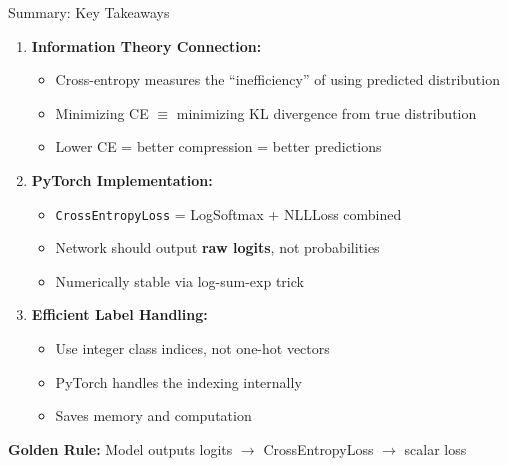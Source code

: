 \documentclass[xcolor=svgnames, 8pt, handout, standalone]{beamer}
\newcommand{\1}{\mathbf{1}}
\begin{document}
\begin{frame}{Summary: Key Takeaways}
\begin{enumerate}
\item \textbf{Information Theory Connection:}
\begin{itemize}
\item Cross-entropy measures the ``inefficiency'' of using predicted distribution
\item Minimizing CE $\equiv$ minimizing KL divergence from true distribution
\item Lower CE = better compression = better predictions
\end{itemize}

\vspace{0.5em}
\item \textbf{PyTorch Implementation:}
\begin{itemize}
\item \texttt{CrossEntropyLoss} = LogSoftmax + NLLLoss combined
\item Network should output \textbf{raw logits}, not probabilities
\item Numerically stable via log-sum-exp trick
\end{itemize}

\vspace{0.5em}
\item \textbf{Efficient Label Handling:}
\begin{itemize}
\item Use integer class indices, not one-hot vectors
\item PyTorch handles the indexing internally
\item Saves memory and computation
\end{itemize}
\end{enumerate}

\begin{tcolorbox}[colback=lightyellow, colframe=hotpink, boxrule=2pt]
\centering
\textbf{Golden Rule:} Model outputs logits $\rightarrow$ CrossEntropyLoss $\rightarrow$ scalar loss
\end{tcolorbox}
\end{frame}
\end{document}

